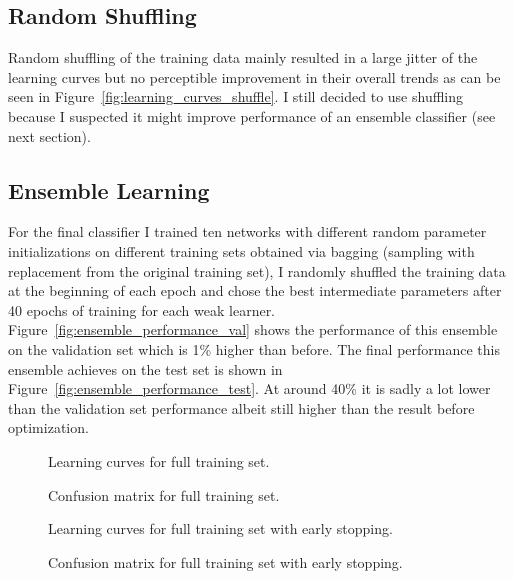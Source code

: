 \documentclass{article}
\begin{document}
\subsection{Random Shuffling}
Random shuffling of the training data mainly resulted in a large jitter of
the learning curves but no perceptible improvement in their overall trends
as can be seen in Figure~\ref{fig:learning_curves_shuffle}. I still decided
to use shuffling because I suspected it might improve performance of an
ensemble classifier (see next section).

\subsection{Ensemble Learning}
For the final classifier I trained ten networks with different random parameter
initializations on different training sets obtained via bagging (sampling with
replacement from the original training set), I randomly shuffled the training
data at the beginning of each epoch and chose the best intermediate parameters
after 40 epochs of training for each weak learner.
Figure~\ref{fig:ensemble_performance_val} shows the performance of this
ensemble on the validation set which is 1\% higher than before. The final
performance this ensemble achieves on the test set is shown in
Figure~\ref{fig:ensemble_performance_test}. At around 40\% it is sadly a lot
lower than the validation set performance albeit still higher than the result
before optimization.

\begin{figure}[H]
  \centering
  
  \caption{Learning curves for full training set.}
  \label{fig:learning_curves_full}
\end{figure}

\begin{figure}[H]
  \centering
  
  \caption{Confusion matrix for full training set.}
  \label{fig:confusion_matrix_full}
\end{figure}

\begin{figure}[H]
  \centering
  
  \caption{Learning curves for full training set with early stopping.}
  \label{fig:learning_curves_stop_early}
\end{figure}

\begin{figure}[H]
  \centering
  
  \caption{Confusion matrix for full training set with early stopping.}
  \label{fig:confusion_matrix_stop_early}
\end{figure}
\end{document}
